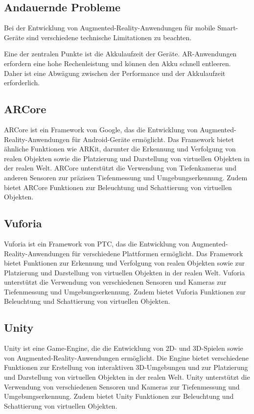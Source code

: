 \subsection{Andauernde Probleme}

Bei der Entwicklung von Augmented-Reality-Anwendungen für mobile Smart-Geräte sind verschiedene technische Limitationen zu beachten. 

Eine der zentralen Punkte ist die Akkulaufzeit der Geräte. AR-Anwendungen erfordern eine hohe Rechenleistung und können den Akku schnell entleeren. Daher ist eine Abwägung zwischen der Performance und der Akkulaufzeit erforderlich. 





\subsection{ARCore}

ARCore ist ein Framework von Google, das die Entwicklung von Augmented-Reality-Anwendungen für Android-Geräte ermöglicht. Das Framework bietet ähnliche Funktionen wie ARKit, darunter die Erkennung und Verfolgung von realen Objekten sowie die Platzierung und Darstellung von virtuellen Objekten in der realen Welt. ARCore unterstützt die Verwendung von Tiefenkameras und anderen Sensoren zur präzisen Tiefenmessung und Umgebungserkennung. Zudem bietet ARCore Funktionen zur Beleuchtung und Schattierung von virtuellen Objekten. \cite{googledevdoc}

\subsection{Vuforia}

Vuforia ist ein Framework von PTC, das die Entwicklung von Augmented-Reality-Anwendungen für verschiedene Plattformen ermöglicht. Das Framework bietet Funktionen zur Erkennung und Verfolgung von realen Objekten sowie zur Platzierung und Darstellung von virtuellen Objekten in der realen Welt. Vuforia unterstützt die Verwendung von verschiedenen Sensoren und Kameras zur Tiefenmessung und Umgebungserkennung. Zudem bietet Vuforia Funktionen zur Beleuchtung und Schattierung von virtuellen Objekten. \cite{vuforiadevdoc}

\subsection{Unity}

Unity ist eine Game-Engine, die die Entwicklung von 2D- und 3D-Spielen sowie von Augmented-Reality-Anwendungen ermöglicht. Die Engine bietet verschiedene Funktionen zur Erstellung von interaktiven 3D-Umgebungen und zur Platzierung und Darstellung von virtuellen Objekten in der realen Welt. Unity unterstützt die Verwendung von verschiedenen Sensoren und Kameras zur Tiefenmessung und Umgebungserkennung. Zudem bietet Unity Funktionen zur Beleuchtung und Schattierung von virtuellen Objekten. \cite{unitydevdoc}

